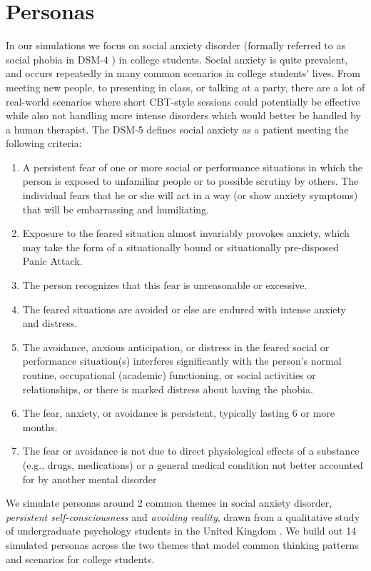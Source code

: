 \documentclass[twoside]{report}
\begin{document}
\section{Personas}
In our simulations we focus on social anxiety disorder (formally referred to as social phobia in DSM-4 \cite{apa2000dsm}) in college students. Social anxiety is quite prevalent, and occurs repeatedly in many common scenarios in college students' lives. From meeting new people, to presenting in class, or talking at a party, there are a lot of real-world scenarios where short CBT-style sessions could potentially be effective while also not handling more intense disorders which would better be handled by a human therapist. The DSM-5 defines social anxiety as a patient meeting the following criteria: 
\begin{enumerate}
    \item A persistent fear of one or more social or performance situations in which the person is exposed to unfamiliar people or to possible scrutiny by others. The individual fears that he or she will act in a way (or show anxiety symptoms) that will be embarrassing and humiliating.
    \item Exposure to the feared situation almost invariably provokes anxiety, which may take the form of a situationally bound or situationally pre-disposed Panic Attack.  
    \item The person recognizes that this fear is unreasonable or excessive.
    \item The feared situations are avoided or else are endured with intense anxiety and distress.
    \item The avoidance, anxious anticipation, or distress in the feared social or performance situation(s) interferes significantly with the person's normal routine, occupational (academic) functioning, or social activities or relationships, or there is marked distress about having the phobia.
    \item The fear, anxiety, or avoidance is persistent, typically lasting 6 or more months.
    \item The fear or avoidance is not due to direct physiological effects of a substance (e.g., drugs, medications) or a general medical condition not better accounted for by another mental disorder \cite{SAMHSA2016SocialPhobia}
\end{enumerate}
We simulate personas around 2 common themes in social anxiety disorder, \emph{persistent self-consciousness} and \emph{avoiding reality}, drawn from a qualitative study of undergraduate psychology students in the United Kingdom \cite{lee2022socially}. We build out 14 simulated personas across the two themes that model common thinking patterns and scenarios for college students.
\end{document}
